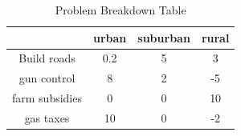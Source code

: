 \documentclass[12pt, letter]{article}
\begin{document}
\begin{table}[h]
    \centering
    \caption{Problem Breakdown Table}
    \label{tab:label}
    \begin{tabular}{|c|c|c|c|}
    \hline
     & urban & suburban & rural \\
    \hline
    Build roads & 0.2 & 5 & 3 \\
    \hline
    gun control & 8 & 2 & -5 \\
    \hline
    farm subsidies & 0 & 0 & 10 \\
    \hline
    gas taxes & 10 & 0 & -2 \\
    \hline
    \end{tabular}
\end{table}
\end{document}
